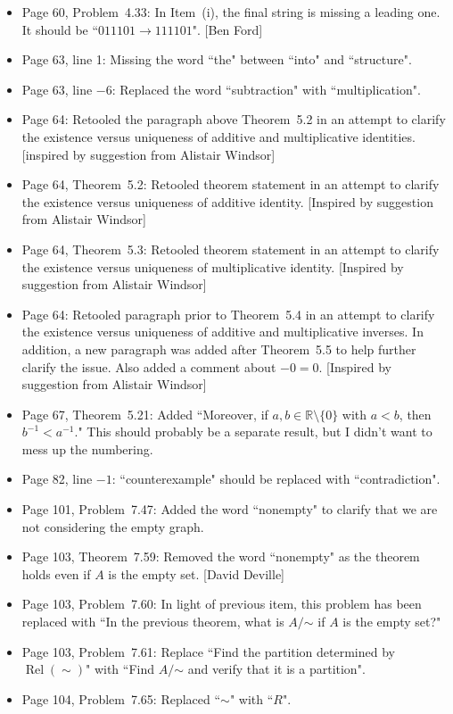 \documentclass[11pt]{article}%
\newcommand{\Rel}{\operatorname{Rel}}
\begin{document}
\begin{itemize}
\item Page 60, Problem~4.33: In Item~(i), the final string is missing a leading one.  It should be ``$011101 \to 111101$". [Ben Ford]
\item Page 63, line 1: Missing the word ``the" between ``into" and ``structure".
\item Page 63, line $-6$: Replaced the word ``subtraction" with ``multiplication". 
\item Page 64: Retooled the paragraph above Theorem~5.2 in an attempt to clarify the existence versus uniqueness of additive and multiplicative identities. [inspired by suggestion from Alistair Windsor]
\item Page 64, Theorem~5.2: Retooled theorem statement in an attempt to clarify the existence versus uniqueness of additive identity. [Inspired by suggestion from Alistair Windsor]
\item Page 64, Theorem~5.3: Retooled theorem statement in an attempt to clarify the existence versus uniqueness of multiplicative identity. [Inspired by suggestion from Alistair Windsor]
\item Page 64: Retooled paragraph prior to Theorem~5.4 in an attempt to clarify the existence versus uniqueness of additive and multiplicative inverses. In addition, a new paragraph was added after Theorem~5.5 to help further clarify the issue. Also added a comment about $-0=0$. [Inspired by suggestion from Alistair Windsor]
\item Page 67, Theorem~5.21: Added ``Moreover, if $a,b\in \mathbb{R}\setminus\{0\}$ with $a<b$, then $b^{-1}<a^{-1}$." This should probably be a separate result, but I didn't want to mess up the numbering.
\item Page 82, line $-1$: ``counterexample" should be replaced with ``contradiction". 
\item Page 101, Problem~7.47: Added the word ``nonempty" to clarify that we are not considering the empty graph.
\item Page 103, Theorem~7.59: Removed the word ``nonempty" as the theorem holds even if $A$ is the empty set. [David Deville]
\item Page 103, Problem~7.60: In light of previous item, this problem has been replaced  with ``In the previous theorem, what is $A/\mathord\sim$ if $A$ is the empty set?"
\item Page 103, Problem~7.61: Replace ``Find the partition determined by $\Rel(\sim)$" with ``Find $A/\mathord\sim$ and verify that it is a partition".
\item Page 104, Problem~7.65: Replaced ``$\sim$" with ``$R$".

\end{itemize}
\end{document}
